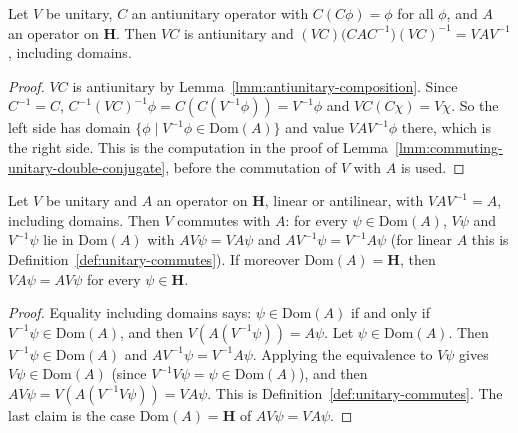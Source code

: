 \begin{lemma}
    \label{lmm:unitary-conjugate-double-antiunitary}
    \leanok
    Let $V$ be unitary, $C$ an antiunitary operator with $C(C\phi) = \phi$ for all $\phi$, and $A$ an operator on $\mathbf{H}$. Then $VC$ is antiunitary and $(VC)\big(CAC^{-1}\big)(VC)^{-1} = VAV^{-1}$, including domains.
\end{lemma}
\begin{proof}
    \leanok
    $VC$ is antiunitary by Lemma~\ref{lmm:antiunitary-composition}. Since $C^{-1} = C$, $C^{-1}(VC)^{-1}\phi = C(C(V^{-1}\phi)) = V^{-1}\phi$ and $VC(C\chi) = V\chi$. So the left side has domain $\{ \phi \mid V^{-1}\phi \in \text{Dom}(A) \}$ and value $VAV^{-1}\phi$ there, which is the right side. This is the computation in the proof of Lemma~\ref{lmm:commuting-unitary-double-conjugate}, before the commutation of $V$ with $A$ is used.
\end{proof}

\begin{lemma}
    \label{lmm:unitary-commutes-of-conj-eq}
    \leanok
    Let $V$ be unitary and $A$ an operator on $\mathbf{H}$, linear or antilinear, with $VAV^{-1} = A$, including domains. Then $V$ commutes with $A$: for every $\psi \in \text{Dom}(A)$, $V\psi$ and $V^{-1}\psi$ lie in $\text{Dom}(A)$ with $AV\psi = VA\psi$ and $AV^{-1}\psi = V^{-1}A\psi$ (for linear $A$ this is Definition~\ref{def:unitary-commutes}). If moreover $\text{Dom}(A) = \mathbf{H}$, then $VA\psi = AV\psi$ for every $\psi \in \mathbf{H}$.
\end{lemma}
\begin{proof}
    \leanok
    Equality including domains says: $\psi \in \text{Dom}(A)$ if and only if $V^{-1}\psi \in \text{Dom}(A)$, and then $V(A(V^{-1}\psi)) = A\psi$. Let $\psi \in \text{Dom}(A)$. Then $V^{-1}\psi \in \text{Dom}(A)$ and $AV^{-1}\psi = V^{-1}A\psi$. Applying the equivalence to $V\psi$ gives $V\psi \in \text{Dom}(A)$ (since $V^{-1}V\psi = \psi \in \text{Dom}(A)$), and then $AV\psi = V(A(V^{-1}V\psi)) = VA\psi$. This is Definition~\ref{def:unitary-commutes}. The last claim is the case $\text{Dom}(A) = \mathbf{H}$ of $AV\psi = VA\psi$.
\end{proof}


